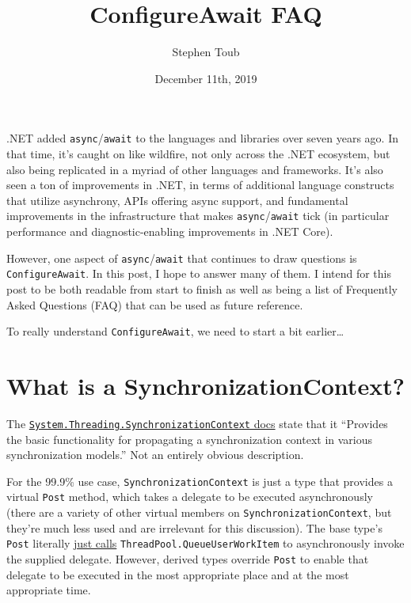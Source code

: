 \documentclass[a4paper,12pt,notitlepage,twoside,openright]{article}
\title{ConfigureAwait FAQ}
\author{Stephen Toub}
\date{December 11th, 2019}
\begin{document}
\maketitle

.NET added \texttt{async}/\texttt{await} to the languages and libraries
over seven years ago. In that time, it's caught on like wildfire, not
only across the .NET ecosystem, but also being replicated in a myriad of
other languages and frameworks. It's also seen a ton of improvements in
.NET, in terms of additional language constructs that utilize
asynchrony, APIs offering async support, and fundamental improvements in
the infrastructure that makes \texttt{async}/\texttt{await} tick (in
particular performance and diagnostic-enabling improvements in .NET
Core).

However, one aspect of \texttt{async}/\texttt{await} that continues to
draw questions is \texttt{ConfigureAwait}. In this post, I hope to
answer many of them. I intend for this post to be both readable from
start to finish as well as being a list of Frequently Asked Questions
(FAQ) that can be used as future reference.

To really understand \texttt{ConfigureAwait}, we need to start a bit
earlier\ldots{}

\hypertarget{what-is-a-synchronizationcontext}{%
\section{What is a
SynchronizationContext?}\label{what-is-a-synchronizationcontext}}

The
\href{https://docs.microsoft.com/en-us/dotnet/api/system.threading.synchronizationcontext}{\texttt{System.Threading.SynchronizationContext}
docs} state that it ``Provides the basic functionality for propagating a
synchronization context in various synchronization models.'' Not an
entirely obvious description.

For the 99.9\% use case, \texttt{SynchronizationContext} is just a type
that provides a virtual \texttt{Post} method, which takes a delegate to
be executed asynchronously (there are a variety of other virtual members
on \texttt{SynchronizationContext}, but they're much less used and are
irrelevant for this discussion). The base type's \texttt{Post} literally
\href{https://github.com/dotnet/runtime/blob/5e67c2480d8b9361923566243c1395a3d1a5d617/src/libraries/System.Private.CoreLib/src/System/Threading/SynchronizationContext.cs\#L25}{just
calls} \texttt{ThreadPool.QueueUserWorkItem} to asynchronously invoke
the supplied delegate. However, derived types override \texttt{Post} to
enable that delegate to be executed in the most appropriate place and at
the most appropriate time.
\end{document}
